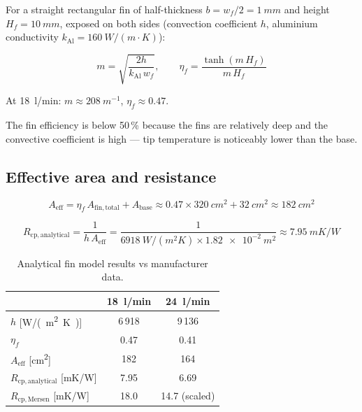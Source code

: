 \documentclass[a4paper,11pt]{article}
\begin{document}
For a straight rectangular fin of half-thickness $b = w_f/2 = \SI{1}{mm}$ and
height $H_f = \SI{10}{mm}$, exposed on both sides (convection coefficient $h$,
aluminium conductivity $k_{\mathrm{Al}} = \SI{160}{W/(m\cdot K)}$):

\begin{equation}
  m = \sqrt{\frac{2h}{k_{\mathrm{Al}}\,w_f}}, \qquad
  \eta_f = \frac{\tanh(m\,H_f)}{m\,H_f}
\end{equation}

At \SI{18}{l/min}: $m \approx \SI{208}{m^{-1}}$, $\eta_f \approx 0.47$.

The fin efficiency is below 50\,\% because the fins are relatively deep and the
convective coefficient is high --- tip temperature is noticeably lower than the base.

\subsection{Effective area and resistance}

\begin{equation}
  A_{\mathrm{eff}} = \eta_f\,A_{\mathrm{fin,total}} + A_{\mathrm{base}}
                   \approx 0.47 \times \SI{320}{cm^2} + \SI{32}{cm^2}
                   \approx \SI{182}{cm^2}
\end{equation}

\begin{equation}
  R_{\mathrm{cp,analytical}} = \frac{1}{h\,A_{\mathrm{eff}}}
    = \frac{1}{\SI{6918}{W/(m^2 K)} \times \SI{1.82e-2}{m^2}}
    \approx \SI{7.95}{mK/W}
\end{equation}

\begin{table}[H]
\centering
\caption{Analytical fin model results vs manufacturer data.}
\begin{tabular}{lcc}
\toprule
 & \SI{18}{l/min} & \SI{24}{l/min} \\
\midrule
$h$ [\si{W/(m^2 K)}]           & 6\,918 & 9\,136 \\
$\eta_f$                        & 0.47   & 0.41   \\
$A_{\mathrm{eff}}$ [\si{cm^2}]  & 182    & 164    \\
$R_{\mathrm{cp,analytical}}$ [\si{mK/W}] & 7.95 & 6.69 \\
$R_{\mathrm{cp,Mersen}}$ [\si{mK/W}]     & 18.0 & 14.7 (scaled) \\
\bottomrule
\end{tabular}
\end{table}
\end{document}
